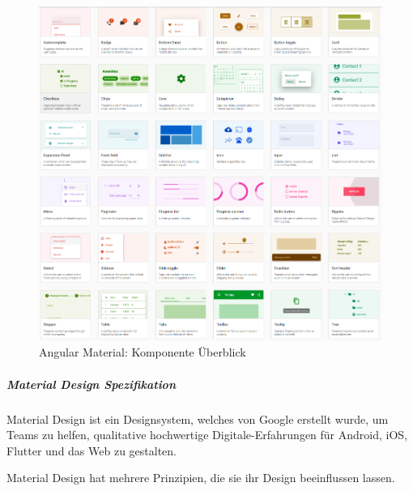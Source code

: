 \begin{figure}
    \centering
    \includegraphics[scale=0.5]{pics/AngularMaterialsComponentsOverview.png}
    \caption{Angular Material: Komponente Überblick}
    \label{fig:impl:angular-material-overview-components}
\end{figure}

\subparagraph{Material Design Spezifikation}
Material Design ist ein Designsystem, welches von Google erstellt wurde, um Teams zu helfen, qualitative hochwertige Digitale-Erfahrungen für Android, iOS, Flutter und das Web zu gestalten.

Material Design hat mehrere Prinzipien, die sie ihr Design beeinflussen lassen.

